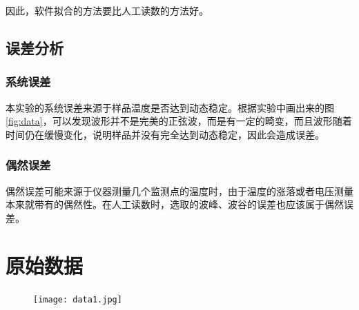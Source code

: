 \documentclass{ctexart}
\begin{document}
	因此，软件拟合的方法要比人工读数的方法好。
	\subsection{误差分析}
	\subsubsection{系统误差}
	本实验的系统误差来源于样品温度是否达到动态稳定。根据实验中画出来的图\ref{fig:data}，可以发现波形并不是完美的正弦波，而是有一定的畸变，而且波形随着时间仍在缓慢变化，说明样品并没有完全达到动态稳定，因此会造成误差。
	\subsubsection{偶然误差}
	偶然误差可能来源于仪器测量几个监测点的温度时，由于温度的涨落或者电压测量本来就带有的偶然性。在人工读数时，选取的波峰、波谷的误差也应该属于偶然误差。
	\newpage
	\section{原始数据}
	\begin{figure}[h]
		\centering
		\texttt{[image: data1.jpg]}
	\end{figure}
\end{document}
